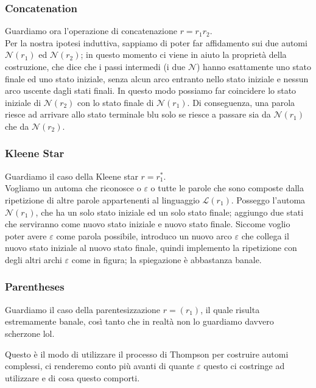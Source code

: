 \documentclass[class=book, crop=false, oneside, 12pt]{standalone}
\begin{document}
\subsubsection{Concatenation}
Guardiamo ora l’operazione di concatenazione \(r = r_1 r_2\).\\
Per la nostra ipotesi induttiva, sappiamo di poter far affidamento sui due automi \(\mathcal{N}(r_1)\) ed \(\mathcal{N}(r_2)\); in questo momento ci viene in aiuto la proprietà della costruzione, che dice che i passi intermedi (i due \(\mathcal{N}\)) hanno esattamente uno stato finale ed uno stato iniziale, senza alcun arco entranto nello stato iniziale e nessun arco uscente dagli stati finali. 
In questo modo possiamo far coincidere lo stato iniziale di \(\mathcal{N}(r_2)\) con lo stato finale di \(\mathcal{N}(r_1)\). 
Di conseguenza, una parola riesce ad arrivare allo stato terminale blu solo se riesce a passare sia da \(\mathcal{N}(r_1)\) che da \(\mathcal{N}(r_2)\).

\subsubsection{Kleene Star}
Guardiamo il caso della Kleene star \(r = r_1^*\).\\
Vogliamo un automa che riconosce o \(\varepsilon\) o tutte le parole che sono composte dalla ripetizione di altre parole appartenenti al linguaggio \(\mathcal{L}(r_1)\).
Posseggo l’automa \(\mathcal{N}(r_1)\), che ha un solo stato iniziale ed un solo stato finale; aggiungo due stati che serviranno come nuovo stato iniziale e nuovo stato finale.
Siccome voglio poter avere \(\varepsilon\) come parola possibile, introduco un nuovo arco \(\varepsilon\) che collega il nuovo stato iniziale al nuovo stato finale, quindi implemento la ripetizione con degli altri archi \(\varepsilon\) come in figura; la spiegazione è abbastanza banale.

\subsubsection{Parentheses}
Guardiamo il caso della parentesizzazione \(r = ( r_1 )\), il quale risulta estremamente banale, così tanto che in realtà non lo guardiamo davvero scherzone lol.

Questo è il modo di utilizzare il processo di Thompson per costruire automi complessi, ci renderemo conto più avanti di quante \(\varepsilon\) questo ci costringe ad utilizzare e di cosa questo comporti.
\end{document}
